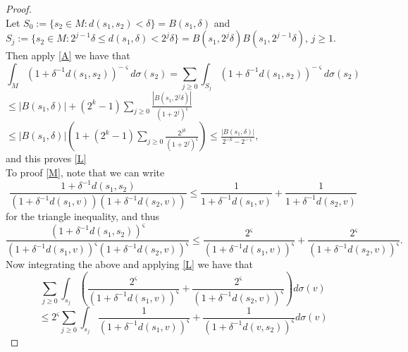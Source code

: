 \documentclass[10pt]{article}
\theoremstyle{definition}
\numberwithin{equation}{section}
\begin{document}
	\begin{proof}
		\ \\
		\normalfont
		Let $ S_0 := \{s_2\in M: d(s_1,s_2)< \delta\} = B(s_1,\delta)$ and\\ $S_j := \{s_2\in M : 2^{j-1} \delta \leq d(s_1,\delta)<2^j\delta\} = B(s_1,2^j \delta)  B(s_1,2^{j-1} \delta)$, \hspace{0.2 cm} $j\geq 1$.
		Then apply \eqref{A} we have that
		\begin{equation*}
			\int_M \left(1 + \delta^{-1} d(s_1,s_2) \right)^{-\varsigma}d\sigma(s_2) = \sum_{j\geq 0} \displaystyle \int_{S_j} \left(1 + \delta^{-1} d(s_1,s_2) \right)^{-\varsigma}d\sigma(s_2)
		\end{equation*}
$\leq |B(s_1,\delta)|+ (2^k -1) \sum_{j\geq 0} \frac{|B(s_1, 2^j \delta)|}{(1+2^j)^{\varsigma}}$\\
$\leq |B(s_1,\delta)| \left(1+(2^k -1)\sum_{j\geq 0} \frac{2^{jk}}{(1+2^j)^\varsigma} \right) \leq \frac{|B(s_1, \delta)|}{2^{-k} - 2^{-\varsigma}},$\\
and this proves \eqref{L}\\
		To proof \eqref{M}, note that we can write\\
		\begin{equation*}
			\frac{1+\delta^{-1} d(s_1,s_2)}{(1+\delta^{-1} d(s_1,v))(1+\delta^{-1} d(s_2,v))} \leq \frac{1}{1+\delta^{-1} d(s_1,v)} + \frac{1}{1+\delta^{-1} d(s_2,v)}
		\end{equation*}
		for the triangle inequality, and thus
		\begin{equation}
			\frac{(1+\delta^{-1} d(s_1,s_2))^{\varsigma}}{(1+\delta^{-1} d(s_1,v))^{\varsigma} (1+\delta^{-1} d(s_2,v))^{\varsigma}} \leq \frac{2^{\varsigma}}{(1+\delta^{-1} d(s_1,v))^{\varsigma}} + \frac{2^{\varsigma}}{(1+\delta^{-1} d(s_2,v))^{\varsigma}}.
		\end{equation}
		Now integrating the above and applying \eqref{L} we have that
		\begin{equation*}
			\sum_{j\geq 0}\displaystyle\int_{s_j}\left( \frac{2^{\varsigma}}{(1+\delta^{-1} d(s_1,v))^{\varsigma}} + \frac{2^{\varsigma}}{(1+\delta^{-1} d(s_2,v))^{\varsigma}} \right) d\sigma (v)
		\end{equation*}
		\begin{equation*}
			\leq 2^{\varsigma}\sum_{j\geq 0}\displaystyle\int_{s_j}\frac{1}{(1+\delta^{-1} d(s_1,v))^{\varsigma}}+\frac{1}{(1+\delta^{-1} d(v,s_2))^{\varsigma}} d\sigma (v)
		\end{equation*}
		\begin{equation*}

\end{equation*}
\end{proof}
\end{document}
